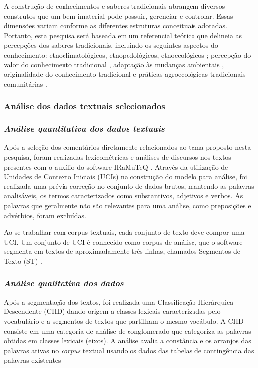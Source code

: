 A construção de conhecimentos e saberes tradicionais abrangem diversos construtos que um bem imaterial pode possuir, gerenciar e controlar. Essas dimensões variam conforme as diferentes estruturas conceituais adotadas. Portanto, esta pesquisa será baseada em um referencial teórico que delineia as percepções dos saberes tradicionais, incluindo os seguintes aspectos do conhecimento: etnoclimatológicos, etnopedológicos, etnoecológicos \cite{Borah2023,FernandezLlamazares2015,Nazarea2006}; percepção do valor do conhecimento tradicional \cite{Gavin2015}, adaptação às mudanças ambientais \cite{FernandezLlamazares2018}, originalidade do conhecimento tradicional e práticas agroecológicas tradicionais comunitárias \cite{Altieri2002}.


\subsubsection*{Análise dos dados textuais selecionados}

\subsubsection*{\textit{Análise quantitativa dos dados textuais}}

Após a seleção dos comentários diretamente relacionados ao tema proposto nesta pesquisa, foram realizadas lexicométricas e análises de discursos nos textos presentes com o auxílio do software IRaMuTeQ \cite{Paulovich2008,DaSilvaCezar2018}. Através da utilização de Unidades de Contexto Iniciais (UCIs) na construção do modelo para análise, foi realizada uma prévia correção no conjunto de dados brutos, mantendo as palavras analisáveis, os termos caracterizados como substantivos, adjetivos e verbos. As palavras que geralmente não são relevantes para uma análise, como preposições e advérbios, foram excluídas.

Ao se trabalhar com corpus textuais, cada conjunto de texto deve compor uma UCI. Um conjunto de UCI é conhecido como corpus de análise, que o software segmenta em textos de aproximadamente três linhas, chamados Segmentos de Texto (ST) \cite{Fernandes2018ManualPortuges}. 

\subsubsection*{\textit{Análise qualitativa dos dados}}

Após a segmentação dos textos, foi realizada uma Classificação Hierárquica Descendente (CHD) dando origem a classes lexicais caracterizadas pelo vocabulário e a segmentos de textos que partilham o mesmo vocábulo. A CHD consiste em uma categoria de análise de conglomerado que categoriza as palavras obtidas em classes lexicais (eixos). A análise avalia a constância e os arranjos das palavras ativas no \textit{corpus} textual usando os dados das tabelas de contingência das palavras existentes \cite{Mendes2019,Carvalho2020a}. 

